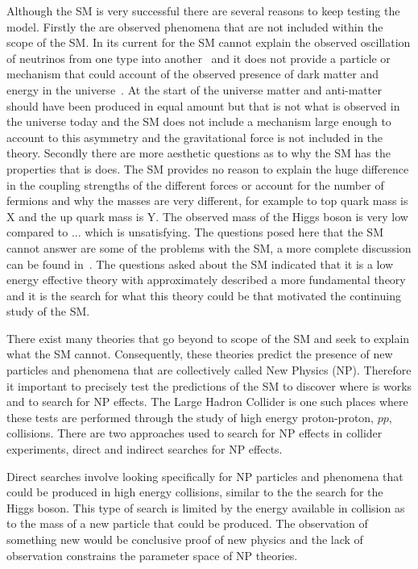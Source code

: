 Although the SM is very successful there are several reasons to keep testing the model. Firstly the are observed phenomena that are not included within the scope of the SM. %
In its current for the SM cannot explain the observed oscillation of neutrinos from one type into another~\cite{} and it does not provide a particle or mechanism that could account of the observed presence of dark matter and energy in the universe~\cite{}. At the start of the universe matter and anti-matter should have been produced in equal amount but that is not what is observed in the universe today and the SM does not include a mechanism large enough to account to this asymmetry and the gravitational force is not included in the theory.
Secondly there are more aesthetic questions as to why the SM has the properties that is does. 
The SM provides no reason to explain the huge difference in the coupling strengths of the different forces or account for the number of fermions and why the masses are very different, for example to top quark mass is X and the up quark mass is Y. The observed mass of the Higgs boson is very low compared to ... which is unsatisfying. 
The questions posed here that the SM cannot answer are some of the problems with the SM, a more complete discussion can be found in~\cite{}. 
The questions asked about the SM indicated that it is a low energy effective theory with approximately described a more fundamental theory and it is the search for what this theory could be that motivated the continuing study of the SM. 

There exist many theories that go beyond to scope of the SM and seek to explain what the SM cannot. Consequently, these theories predict the presence of new particles and phenomena that are collectively called New Physics (NP). 
Therefore it important to precisely test the predictions of the SM to discover where is works and to search for NP effects. The Large Hadron Collider is one such places where these tests are performed through the study of high energy proton-proton, $pp$, collisions. There are two approaches used to search for NP effects in collider experiments, direct and indirect searches for NP effects.

Direct searches involve looking specifically for NP particles and phenomena that could be produced in high energy collisions, similar to the the search for the Higgs boson. This type of search is limited by the energy available in collision as to the mass of a new particle that could be produced. The observation of something new would be conclusive proof of new physics and the lack of observation constrains the parameter space of NP theories.

